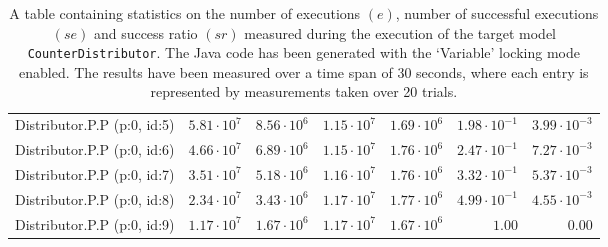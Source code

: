 \begin{table}[htbp]
{\begin{tabular}{lrrrrrr}
\hspace{3mm}Distributor.P.P (p:0, id:5) & $5.81 \cdot 10^{7}$ & $8.56 \cdot 10^{6}$ & $1.15 \cdot 10^{7}$ & $1.69 \cdot 10^{6}$ & $1.98 \cdot 10^{-1}$ & $3.99 \cdot 10^{-3}$ \\
\hspace{3mm}Distributor.P.P (p:0, id:6) & $4.66 \cdot 10^{7}$ & $6.89 \cdot 10^{6}$ & $1.15 \cdot 10^{7}$ & $1.76 \cdot 10^{6}$ & $2.47 \cdot 10^{-1}$ & $7.27 \cdot 10^{-3}$ \\
\hspace{3mm}Distributor.P.P (p:0, id:7) & $3.51 \cdot 10^{7}$ & $5.18 \cdot 10^{6}$ & $1.16 \cdot 10^{7}$ & $1.76 \cdot 10^{6}$ & $3.32 \cdot 10^{-1}$ & $5.37 \cdot 10^{-3}$ \\
\hspace{3mm}Distributor.P.P (p:0, id:8) & $2.34 \cdot 10^{7}$ & $3.43 \cdot 10^{6}$ & $1.17 \cdot 10^{7}$ & $1.77 \cdot 10^{6}$ & $4.99 \cdot 10^{-1}$ & $4.55 \cdot 10^{-3}$ \\
\hspace{3mm}Distributor.P.P (p:0, id:9) & $1.17 \cdot 10^{7}$ & $1.67 \cdot 10^{6}$ & $1.17 \cdot 10^{7}$ & $1.67 \cdot 10^{6}$ &               $1.00$ &               $0.00$ \\
\bottomrule
\end{tabular}
}
\caption{A table containing statistics on the number of executions $(e)$, number of successful executions $(se)$ and success ratio $(sr)$ measured during the execution of the target model \texttt{CounterDistributor}. The Java code has been generated with the `Variable' locking mode enabled. The results have been measured over a time span of 30 seconds, where each entry is represented by measurements taken over 20 trials.}
\label{table:frequency_results_counterdistributor_variable}
\end{table}